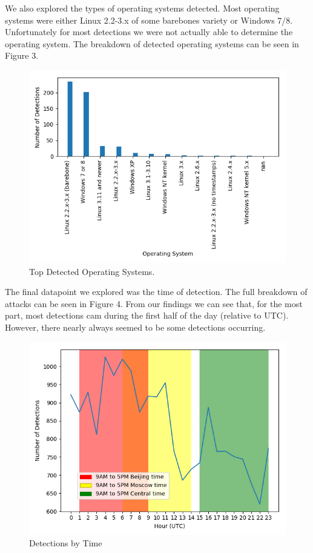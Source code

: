 We also explored the types of operating systems detected. Most operating systems were either Linux 2.2-3.x of some barebones variety or Windows 7/8. Unfortunately for most detections we were not actually able to determine the operating system. The breakdown of detected operating systems can be seen in Figure 3.

\begin{figure}[H]
	\includegraphics[width=\linewidth]{top_os.png}
	\caption{Top Detected Operating Systems.}
	\label{fig:top-os}
\end{figure}

The final datapoint we explored was the time of detection. The full breakdown of attacks can be seen in Figure 4. From our findings we can see that, for the most part, most detections cam during the first half of the day (relative to UTC). However, there nearly always seemed to be some detections occurring. 

\begin{figure}[H]
		\includegraphics[width=\linewidth]{time_breakdown.png}
	\caption{Detections by Time}
	\label{fig:top-time}
\end{figure}

